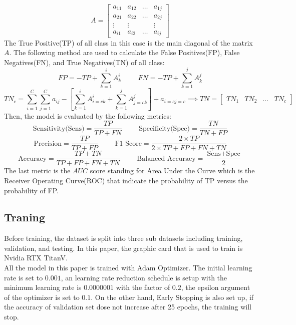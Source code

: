 \[
	A = \begin{bmatrix}
		a_{11} & a_{12} & \dots & a_{1j} \\
		a_{21} & a_{22} & \dots & a_{2j} \\
		\vdots & \vdots	&  & \vdots\\
		a_{i1} & a_{i2} & \dots & a_{ij} 
	\end{bmatrix}
\]
The True Positive(TP) of all class in this case is the main diagonal of the matrix $A$. The following method are used to calculate the False Positives(FP), False Negatives(FN), and True Negatives(TN) of all class:
\[
	FP = -TP + \sum_{k=1}^{i}A^i_k \hspace{1cm} FN = -TP + \sum_{k=1}^{j}A^j_k
\]
\[
	TN_c = \sum_{i=1}^{C}\sum_{j=1}^{C}a_{ij} - \left[ \sum_{k=1}^{i}A^i_{i=c k} + \sum_{k=1}^{j}A^j_{j=c k} \right] + a_{i=c j=c} \implies TN = \begin{bmatrix}
		TN_1 & TN_2 & \dots & TN_c
	\end{bmatrix}
\]
Then, the model is evaluated by the following metrics:
\[\text{Sensitivity(Sens)} = \frac{TP}{TP + FN} \hspace{1cm} \text{Specificity(Spec)} = \frac{TN}{TN + FP}\]
\[\text{Precision} = \frac{TP}{TP + FP} \hspace{1cm} \text{F1 Score} = \frac{2 \times TP}{2 \times TP + FP + FN + TN}\]
\[\text{Accuracy} = \frac{TP + TN}{TP + FP + FN + TN} \hspace{1cm} \text{Balanced Accuracy} = \frac{\text{Sens} + \text{Spec}}{2}\]
The last metric is the $AUC$ score standing for Area Under the Curve which is the Receiver Operating Curve(ROC) that indicate the probability of TP versus the probability of FP.  
\subsection{Traning}
Before training, the dataset is split into three sub datasets including training, validation, and testing. In this paper, the graphic card that is used to train is Nvidia RTX TitanV.\\
All the model in this paper is trained with Adam Optimizer\cite{6980}. The initial learning rate is set to $0.001$, an learning rate reduction schedule is setup with the minimum learning rate is $0.0000001$ with the factor of $0.2$, the epsilon argument of the optimizer is set to $0.1$. On the other hand, Early Stopping is also set up, if the accuracy of validation set dose not increase after 25 epochs, the training will stop. 
